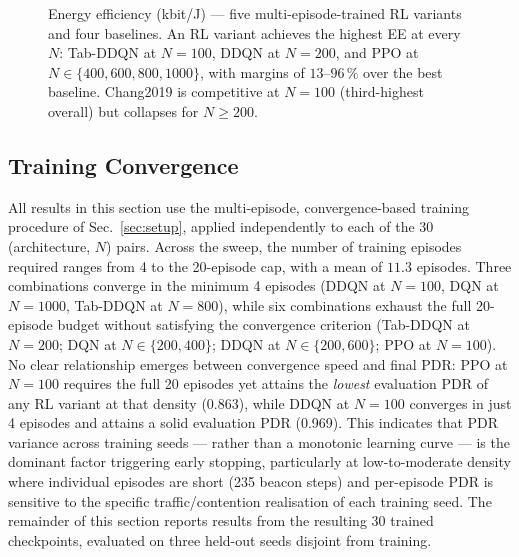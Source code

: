 \documentclass[conference]{IEEEtran}
\begin{document}
\begin{figure}[t]
\caption{Energy efficiency (kbit/J) — five multi-episode-trained RL
  variants and four baselines.  An RL variant achieves the highest EE at
  every $N$: Tab-DDQN at $N\!=\!100$, DDQN at $N\!=\!200$, and PPO at
  $N\!\in\!\{400,600,800,1000\}$, with margins of
  $13$--$96\,\%$ over the best baseline.  Chang2019 is competitive at
  $N\!=\!100$ (third-highest overall) but collapses for $N\!\geq\!200$.}
\label{fig:ee}
\end{figure}

\subsection{Training Convergence}
\label{sec:training}

All results in this section use the multi-episode, convergence-based
training procedure of Sec.~\ref{sec:setup}, applied independently to each
of the 30 (architecture, $N$) pairs.
Across the sweep, the number of training episodes required ranges from 4
to the 20-episode cap, with a mean of $11.3$ episodes.
Three combinations converge in the minimum 4 episodes (DDQN at $N=100$, DQN
at $N=1000$, Tab-DDQN at $N=800$), while six combinations exhaust the full
20-episode budget without satisfying the convergence criterion (Tab-DDQN at
$N=200$; DQN at $N\in\{200,400\}$; DDQN at $N\in\{200,600\}$; PPO at
$N=100$).
No clear relationship emerges between convergence speed and final PDR: PPO
at $N=100$ requires the full 20 episodes yet attains the \emph{lowest}
evaluation PDR of any RL variant at that density (0.863), while DDQN at
$N=100$ converges in just 4 episodes and attains a solid evaluation PDR
(0.969).
This indicates that PDR variance across training seeds — rather than a
monotonic learning curve — is the dominant factor triggering early
stopping, particularly at low-to-moderate density where individual episodes
are short (235 beacon steps) and per-episode PDR is sensitive to the
specific traffic/contention realisation of each training seed.
The remainder of this section reports results from the resulting 30 trained
checkpoints, evaluated on three held-out seeds disjoint from training.
\end{document}
